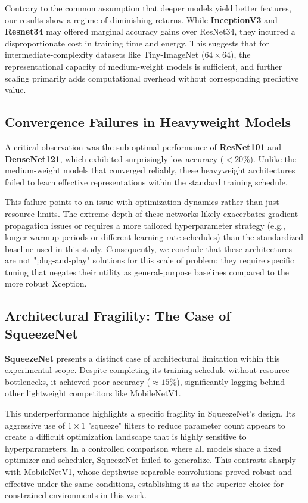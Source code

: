 \documentclass[acmsmall]{acmart}
\begin{document}
Contrary to the common assumption that deeper models yield better features, our results show a regime of diminishing returns. While \textbf{InceptionV3} and \textbf{Resnet34} may offered marginal accuracy gains over ResNet34, they incurred a disproportionate cost in training time and energy. This suggests that for intermediate-complexity datasets like Tiny-ImageNet ($64 \times 64$), the representational capacity of medium-weight models is sufficient, and further scaling primarily adds computational overhead without corresponding predictive value.


\subsection{Convergence Failures in Heavyweight Models}
A critical observation was the sub-optimal performance of \textbf{ResNet101} and \textbf{DenseNet121}, which exhibited surprisingly low accuracy ($<20\%$). Unlike the medium-weight models that converged reliably, these heavyweight architectures failed to learn effective representations within the standard training schedule.

This failure points to an issue with optimization dynamics rather than just resource limits. The extreme depth of these networks likely exacerbates gradient propagation issues or requires a more tailored hyperparameter strategy (e.g., longer warmup periods or different learning rate schedules) than the standardized baseline used in this study. Consequently, we conclude that these architectures are not "plug-and-play" solutions for this scale of problem; they require specific tuning that negates their utility as general-purpose baselines compared to the more robust Xception.

\subsection{Architectural Fragility: The Case of SqueezeNet}
\textbf{SqueezeNet} presents a distinct case of architectural limitation within this experimental scope. Despite completing its training schedule without resource bottlenecks, it achieved poor accuracy ($\approx 15\%$), significantly lagging behind other lightweight competitors like MobileNetV1.

This underperformance highlights a specific fragility in SqueezeNet's design. Its aggressive use of $1 \times 1$ "squeeze" filters to reduce parameter count appears to create a difficult optimization landscape that is highly sensitive to hyperparameters. In a controlled comparison where all models share a fixed optimizer and scheduler, SqueezeNet failed to generalize. This contrasts sharply with MobileNetV1, whose depthwise separable convolutions proved robust and effective under the same conditions, establishing it as the superior choice for constrained environments in this work.
\end{document}
